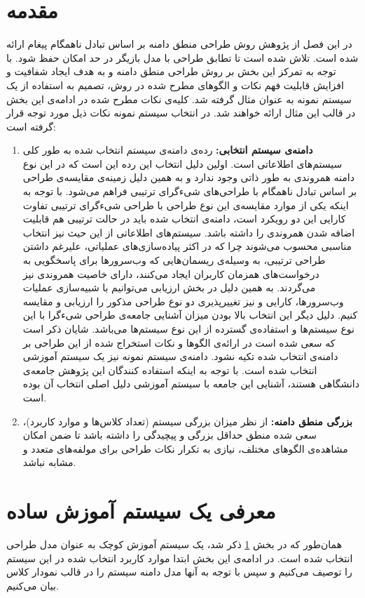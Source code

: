 \section{مقدمه}
\label{sectio:design:preface}
در این فصل از پژوهش روش طراحی منطق دامنه بر اساس تبادل ناهمگام پیغام ارائه شده است. تلاش شده است تا تطابق طراحی با مدل بازیگر در حد امکان حفظ شود. با توجه به تمرکز این بخش بر روش طراحی منطق دامنه و به هدف ایجاد شفافیت و افزایش قابلیت فهم نکات و الگوهای مطرح شده در روش، تصمیم به استفاده از یک سیستم نمونه به عنوان مثال گرفته شد. کلیه‌ی نکات مطرح شده در ادامه‌ی این بخش در قالب این مثال ارائه خواهند شد. در انتخاب سیستم نمونه نکات ذیل مورد توجه قرار گرفته‌ است:
\begin{enumerate}
\item \textbf{دامنه‌ی سیستم انتخابی:}
رده‌ی دامنه‌ی سیستم انتخاب شده به طور کلی سیستم‌های اطلاعاتی است. اولین دلیل انتخاب این رده این است که در این نوع دامنه همروندی به طور ذاتی وجود ندارد و به همین دلیل زمینه‌ی مقایسه‌ی طراحی بر اساس تبادل ناهمگام با  طراحی‌های شیءگرای ترتیبی فراهم می‌شود. با توجه به اینکه یکی از موارد مقایسه‌ی این نوع طراحی با طراحی شیءگرای ترتیبی تفاوت کارایی این دو رویکرد است، دامنه‌ی انتخاب شده باید در حالت ترتیبی هم قابلیت اضافه شدن همروندی را داشته باشد. سیستم‌های اطلاعاتی از این حیث نیز انتخاب مناسبی محسوب می‌شوند چرا که در اکثر پیاده‌سازی‌های عملیاتی، علیرغم داشتن طراحی ترتیبی، به وسیله‌ی ریسمان‌هایی که وب‌سرورها برای پاسخگویی به درخواست‌های همزمان کاربران ایجاد می‌کنند، دارای خاصیت همروندی نیز می‌گردند. به همین دلیل در بخش ارزیابی می‌توانیم با شبیه‌سازی عملیات وب‌سرورها، کارایی و نیز تغییرپذیری دو نوع طراحی مذکور را ارزیابی و مقایسه کنیم.
 دلیل دیگر این انتخاب بالا بودن میزان آشنایی جامعه‌ی طراحی شیءگرا با این نوع سیستم‌ها و استفاده‌ی گسترده از این نوع سیستم‌ها می‌باشد. شایان ذکر است که سعی شده است در ارائه‌ی الگوها و نکات استخراج شده از این طراحی بر دامنه‌ی انتخاب شده تکیه‌ نشود. دامنه‌ی سیستم نمونه نیز یک سیستم آموزشی انتخاب شده است. با توجه به اینکه استفاده کنندگان این پژوهش جامعه‌ی دانشگاهی هستند، آشنایی این جامعه با سیستم آموزشی دلیل اصلی انتخاب آن بوده است. 
\item \textbf{ بزرگی منطق دامنه:}
از نظر میزان بزرگی سیستم (تعداد کلاس‌ها و موارد کاربرد)،‌  سعی شده منطق حداقل بزرگی و پیچیدگی را داشته باشد تا ضمن امکان مشاهده‌ی الگوهای مختلف، نیازی به تکرار نکات طراحی برای مولفه‌های متعدد و مشابه نباشد. 
\end{enumerate} 

\section{معرفی یک سیستم آموزش ساده }
\label{section:eduIntro}
همان‌طور که در بخش \ref{sectio:design:preface} ذکر شد،‌ یک سیستم آموزش کوچک به عنوان مدل طراحی انتخاب شده است. در ادامه‌ی این بخش ابتدا موارد کاربرد انتخاب شده در این سیستم را توصیف می‌کنیم و سپس با توجه به‌ آنها مدل دامنه سیستم را در قالب نمودار کلاس بیان می‌کنیم.

